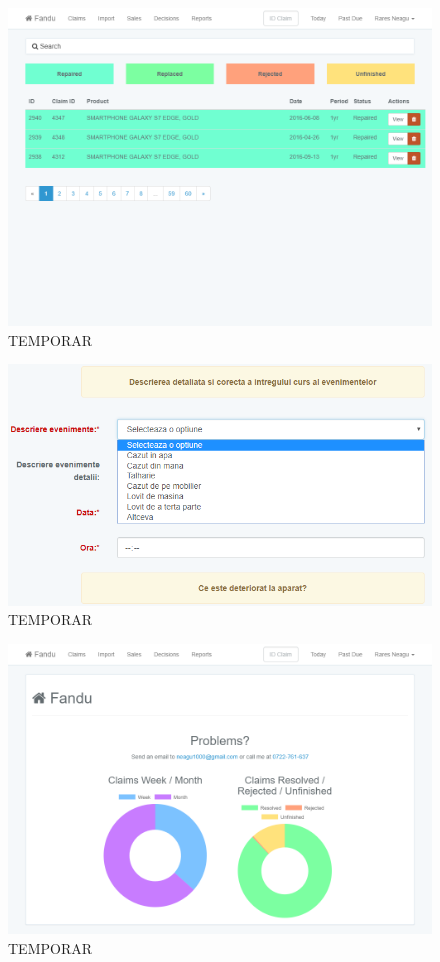 	\begin{figure}
		\includegraphics[width=\linewidth]{../imagini/decisions_filter.png}
		\caption{TEMPORAR}
		\label{fig:TEMP}
	\end{figure}
	\begin{figure}
		\includegraphics[width=\linewidth]{../imagini/descriere_eveniment.png}
		\caption{TEMPORAR}
		\label{fig:TEMP}
	\end{figure}
	\begin{figure}
		\includegraphics[width=\linewidth]{../imagini/home_page.png}
		\caption{TEMPORAR}
		\label{fig:TEMP}
	\end{figure}
